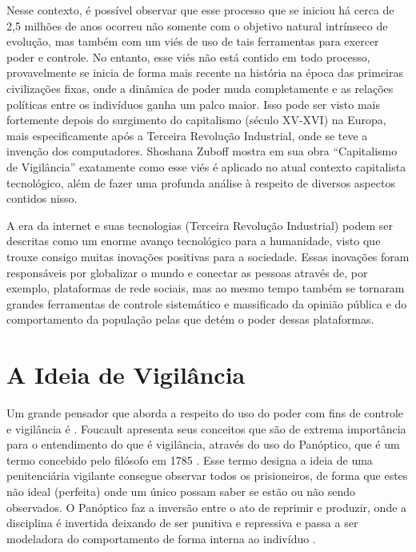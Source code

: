 \documentclass[
	12pt,
	openright,
	twoside,
	a4paper,
	english,
	french,
	spanish,
	brazil
]{abntex2}
\begin{document}
  Nesse contexto, é possível observar que esse processo que se iniciou há cerca
  de 2,5 milhões de anos ocorreu não somente com o objetivo natural intrínseco
  de evolução, mas também com um viés de uso de tais ferramentas para exercer
  poder e controle. No entanto, esse viés não está contido em todo processo,
  provavelmente se inicia de forma mais recente na história na época das
  primeiras civilizações fixas, onde a dinâmica de poder muda completamente e as
  relações políticas entre os indivíduos ganha um palco maior. Isso pode ser
  visto mais fortemente depois do surgimento do capitalismo (século XV-XVI) na
  Europa, mais especificamente após a Terceira Revolução Industrial, onde se
  teve a invenção dos computadores. Shoshana Zuboff mostra em sua obra
  ``Capitalismo de Vigilância'' exatamente como esse viés é aplicado no atual
  contexto capitalista tecnológico, além de fazer uma profunda análise à
  respeito de diversos aspectos contidos nisso.

  A era da internet e suas tecnologias (Terceira Revolução Industrial) podem ser
  descritas como um enorme avanço tecnológico para a humanidade, visto que
  trouxe consigo muitas inovações positivas para a sociedade. Essas inovações
  foram responsáveis por globalizar o mundo e conectar as pessoas através de,
  por exemplo, plataformas de rede sociais, mas ao mesmo tempo também se
  tornaram grandes ferramentas de controle sistemático e massificado da opinião
  pública e do comportamento da população pelas que detém o poder dessas
  plataformas.

  \chapter{A Ideia de Vigilância}

  Um grande pensador que aborda a respeito do uso do poder com fins de controle
  e vigilância é . Foucault apresenta
  seus conceitos que são de extrema importância para o entendimento do que é
  vigilância, através do uso do Panóptico, que é um termo concebido pelo
  filósofo  em 1785
  \cite{bentham-panoptico}. Esse termo designa a ideia de uma penitenciária
  vigilante consegue observar todos os prisioneiros, de forma que estes não
  ideal (perfeita) onde um único possam saber se estão ou não sendo observados.
  O Panóptico faz a inversão entre o ato de reprimir e produzir, onde a
  disciplina é invertida deixando de ser punitiva e repressiva e passa a ser
  modeladora do comportamento de forma interna ao indivíduo
  \cite{trindade-foucault-panoptico}.
\end{document}
